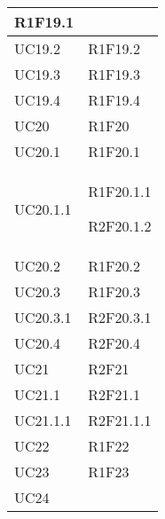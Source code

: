 \begin{center}
\begin{longtable}{|p{44mm}|p{22mm}|}
R1F19.1 \newline
\\
\hline
UC19.2 &

R1F19.2 \newline
\\
\hline
UC19.3 &

R1F19.3 \newline
\\
\hline
UC19.4 &

R1F19.4 \newline
\\
\hline
UC20 &

R1F20 \newline
\\
\hline
UC20.1 &

R1F20.1 \newline
\\
\hline
UC20.1.1 &

R1F20.1.1 \newline

R2F20.1.2 \newline
\\
\hline
UC20.2 &

R1F20.2 \newline
\\
\hline
UC20.3 &

R1F20.3 \newline
\\
\hline
UC20.3.1 &

R2F20.3.1 \newline
\\
\hline
UC20.4 &

R2F20.4 \newline
\\
\hline
UC21 &

R2F21 \newline
\\
\hline
UC21.1 &

R2F21.1 \newline
\\
\hline
UC21.1.1 &

R2F21.1.1 \newline
\\
\hline
UC22 &

R1F22 \newline
\\
\hline
UC23 &

R1F23 \newline
\\
\hline
UC24 &


\end{longtable}
\end{center}
